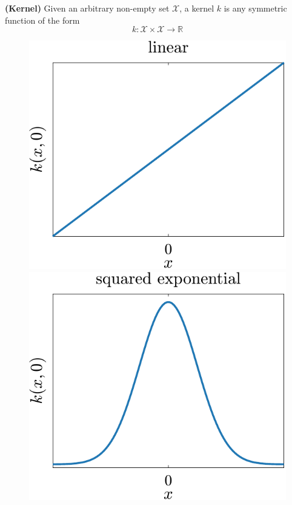 \begin{definition}
	\textbf{(Kernel)} Given an arbitrary non-empty set $\mathcal{X}$, a kernel $k$ is any symmetric function of the form
	\begin{equation}
		k: \mathcal{X} \times \mathcal{X} \rightarrow \mathbb{R}
	\end{equation}
\end{definition}

\begin{figure}[t]
	\centering
	\includegraphics[scale=0.4]{../images/chap2_kernel_li.pdf} \hspace{3pt}
	\includegraphics[scale=0.4]{../images/chap2_kernel_se.pdf} \hspace{3pt}

\end{figure}
